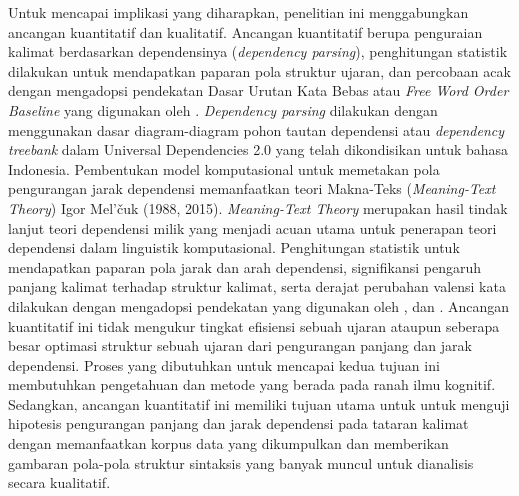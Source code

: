 Untuk mencapai implikasi yang diharapkan, penelitian ini menggabungkan ancangan kuantitatif dan kualitatif. Ancangan kuantitatif berupa penguraian kalimat berdasarkan dependensinya (\textit{dependency parsing}), penghitungan statistik dilakukan untuk mendapatkan paparan pola struktur ujaran, dan percobaan acak dengan mengadopsi pendekatan Dasar Urutan Kata Bebas atau \textit{Free Word Order Baseline} yang digunakan oleh \cite{futrell2015large}. \textit{Dependency parsing} dilakukan dengan menggunakan dasar diagram-diagram pohon tautan dependensi atau \textit{dependency treebank} dalam Universal Dependencies 2.0 \citep{nivre2017universal} yang telah dikondisikan untuk bahasa Indonesia. Pembentukan model komputasional untuk memetakan pola pengurangan jarak dependensi memanfaatkan teori Makna-Teks (\textit{Meaning-Text Theory}) Igor Mel'{\v{c}}uk (1988, 2015). \textit{Meaning-Text Theory} merupakan hasil tindak lanjut teori dependensi milik \cite{tesniere1959elements} yang menjadi acuan utama untuk penerapan teori dependensi dalam linguistik komputasional. Penghitungan statistik untuk mendapatkan paparan pola jarak dan arah dependensi, signifikansi pengaruh panjang kalimat terhadap struktur kalimat, serta derajat perubahan valensi kata dilakukan dengan mengadopsi pendekatan yang digunakan oleh \cite{futrell2015large}, \cite{jiang2015effects} dan \cite{liu2017dependency}. Ancangan kuantitatif ini tidak mengukur tingkat efisiensi sebuah ujaran ataupun seberapa besar optimasi struktur sebuah ujaran dari pengurangan panjang dan jarak dependensi. Proses yang dibutuhkan untuk mencapai kedua tujuan ini membutuhkan pengetahuan dan metode yang berada pada ranah ilmu kognitif. Sedangkan, ancangan kuantitatif ini memiliki tujuan utama untuk untuk menguji hipotesis pengurangan panjang dan jarak dependensi pada tataran kalimat dengan memanfaatkan korpus data yang dikumpulkan dan memberikan gambaran pola-pola struktur sintaksis yang banyak muncul untuk dianalisis secara kualitatif.

